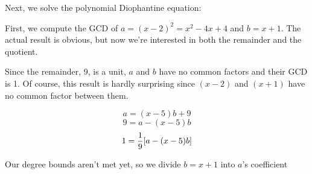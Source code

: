 \begin{comment}
Differentiating to obtain $3x^2-6x$.
Computing the GCD of $x^3-3x^2+4$ and $3x^2-6x$:

\sympyc{long_division(x**3-3*x**2+4, 3*x**2-6*x, x)}
\bigskip
\sympyc{long-division(3*x**2-6*x, -2*x+4)}


Thus, $-2x+4$ is a GCD, which we normalize by dividing through by -2
to obtain $x-2$.  We could now proceed by dividing $x^3-3x^2+4$ by
$x-2$ to obtain $x^2-x-2$ (all factors at unit power), compute the GCD
of $x-2$ and $x^2-x-2$ to obtain $x-2$ (all higher factors at unit
power), divide $x^2-x-2$ by $x-2$ to obtain $x+1$ (the unit
square-free factor), and repeat the process (trivially) with $x-2$ to
decide that $x-2$ is the second square-free factor.  Or, we could
shortcut the entire process by noting that since $x-2$ is linear,
it can only be the second square-free factor.  In any event, we conclude that:

\end{comment}


Next, we solve the polynomial Diophantine equation:


First, we compute the GCD of $a=(x-2)^2=x^2-4x+4$ and $b=x+1$.
The actual result is obvious, but now we're interested
in both the remainder and the quotient.


Since the remainder, 9, is a unit, $a$ and $b$ have no common
factors and their GCD is 1.  Of course, this result is hardly
surprising since $(x-2)$ and $(x+1)$
have no common factor between them.

$$a=(x-5)b+9$$
$$9=a-(x-5)b$$
$$1={1\over9}[a-(x-5)b]$$

Our degree bounds aren't met yet, so we divide $b=x+1$ into $a$'s coefficient %




